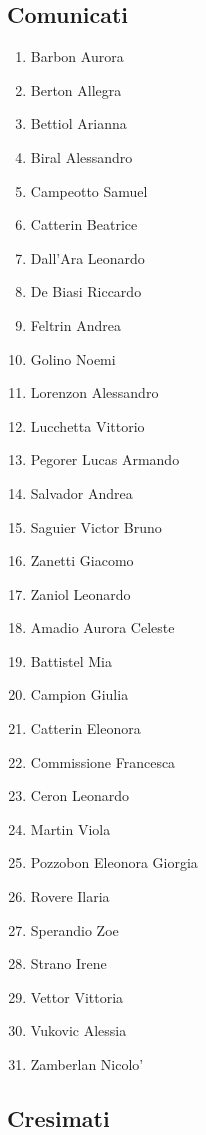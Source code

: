 \subsection{Comunicati}
\begin{multicols}{2}
\begin{enumerate}
  \item Barbon Aurora
  \item Berton Allegra
  \item Bettiol Arianna
  \item Biral Alessandro
  \item Campeotto Samuel
  \item Catterin Beatrice
  \item Dall'Ara Leonardo
  \item De Biasi Riccardo
  \item Feltrin Andrea
  \item Golino Noemi
  \item Lorenzon Alessandro
  \item Lucchetta Vittorio
  \item Pegorer Lucas Armando
  \item Salvador Andrea
  \item Saguier Victor Bruno
  \item Zanetti Giacomo
  \item Zaniol Leonardo
  \item Amadio Aurora Celeste
  \item Battistel Mia
  \item Campion Giulia
  \item Catterin Eleonora
  \item Commissione Francesca
  \item Ceron Leonardo
  \item Martin Viola
  \item Pozzobon Eleonora Giorgia
  \item Rovere Ilaria
  \item Sperandio Zoe
  \item Strano Irene
  \item Vettor Vittoria
  \item Vukovic Alessia
  \item Zamberlan Nicolo'
\end{enumerate}
\end{multicols}

\subsection{Cresimati}
\begin{multicols}{2}
\end{multicols}


